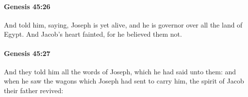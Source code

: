 		\paragraph{Genesis 45:26} %
			\label{GENESIS-45-26}

			And told him, saying, Joseph is yet alive, and he is governor over all the land of Egypt. And Jacob's heart fainted, for he believed them not.


		\paragraph{Genesis 45:27} %
			\label{GENESIS-45-27}

			And they told him all the words of Joseph, which he had said unto them: and when he saw the wagons which Joseph had sent to carry him, the spirit of Jacob their father revived:


